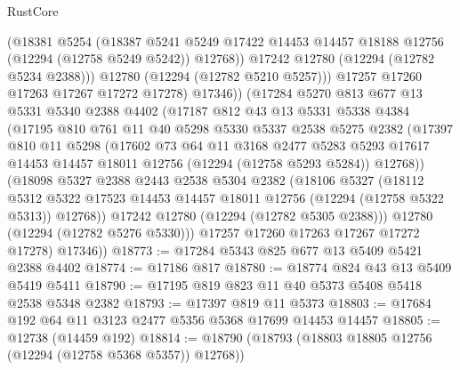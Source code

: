 \begin{lexlean}{RustCore}
\begin{coremodule}
                (@18381
                  @5254
                  (@18387
                    @5241
                    @5249
                    @17422
                    @14453
                    @14457
                    @18188
                    @12756
                    (@12294 (@12758 @5249 @5242))
                    @12768))
                @17242
                @12780
                (@12294 (@12782 @5234 @2388)))
              @12780
              (@12294 (@12782 @5210 @5257)))
            @17257
            @17260
            @17263
            @17267
            @17272
            @17278)
          @17346))
      (@17284
        @5270
        @813
        @677
        @13
        @5331
        @5340
        @2388
        @4402
        (@17187
          @812
          @43
          @13
          @5331
          @5338
          @4384
          (@17195
            @810
            @761
            @11
            @40
            @5298
            @5330
            @5337
            @2538
            @5275
            @2382
            (@17397
              @810
              @11
              @5298
              (@17602
                @73
                @64
                @11
                @3168
                @2477
                @5283
                @5293
                @17617
                @14453
                @14457
                @18011
                @12756
                (@12294 (@12758 @5293 @5284))
                @12768))
            (@18098
              @5327
              @2388
              @2443
              @2538
              @5304
              @2382
              (@18106
                @5327
                (@18112
                  @5312
                  @5322
                  @17523
                  @14453
                  @14457
                  @18011
                  @12756
                  (@12294 (@12758 @5322 @5313))
                  @12768))
              @17242
              @12780
              (@12294 (@12782 @5305 @2388)))
            @12780
            (@12294 (@12782 @5276 @5330)))
          @17257
          @17260
          @17263
          @17267
          @17272
          @17278)
        @17346))
@18773 := @17284 @5343 @825 @677 @13 @5409 @5421 @2388 @4402
@18774 := @17186 @817
@18780 := @18774 @824 @43 @13 @5409 @5419 @5411
@18790 := @17195 @819 @823 @11 @40 @5373 @5408 @5418 @2538 @5348 @2382
@18793 := @17397 @819 @11 @5373
@18803 := @17684 @192 @64 @11 @3123 @2477 @5356 @5368 @17699 @14453 @14457
@18805 := @12738 (@14459 @192)
@18814 := @18790 (@18793 (@18803 @18805 @12756 (@12294 (@12758 @5368 @5357)) @12768))

\end{coremodule}
\end{lexlean}
